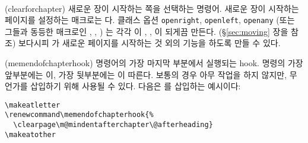 \begin{syntax}
\cmd{\clearforchapter} \\
\end{syntax}
\glossary(clearforchapter)%
  {}%
  {새로운 장이 시작하는 쪽을 선택하는 명령어.}
새로운 장이 시작하는 페이지를 설정하는 매크로는 \cmd{\clearforchapter}다.
클래스 옵션 \texttt{openright}, \texttt{openleft}, \texttt{openany}
(또는 그들과 동등한 매크로인 \cmd{\openright}, \cmd{\openleft}, \cmd{\openany})
는 각각 \cmd{\clearforchapter} 이
\cmd{\cleartorecto}, \cmd{\cleartoverso}, \cmd{\clearpage} 이 되게끔 만든다.
(\S\ref{sec:moving} 장을 참조)
보다시피 \cmd{\clearforchapter}가 새로운 페이지를 시작하는 것 외의 기능을 하도록 만들 수 있다.

\begin{syntax}
\cmd{\memendofchapterhook}
\end{syntax}
\glossary(memendofchapterhook)%
  {}%
  { 명령어의 가장 마지막 부분에서 실행되는 hook.}
\cmd{\chapter} 명령의 가장 앞부분에는 \cmd{\clearforchapter}이,
가장 뒷부분에는 \cmd{\memendofchapterhook}이 따른다.
보통의 경우 아무 작업을 하지 않지만, 무언가를 삽입하기 위해 사용될 수 있다.
다음은 \cmd{\clearpage}를 삽입하는 예시이다:
\begin{verbatim}
\makeatletter
\renewcommand\memendofchapterhook{%
  \clearpage\m@mindentafterchapter\@afterheading}
\makeatother
\end{verbatim}


